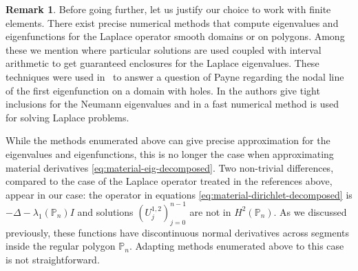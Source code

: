 \documentclass[11pt]{article}
\numberwithin{equation}{section}\newtheorem*{jepEnonce}{\jepEnonceTitle}\newenvironment{enonce*}[1]{\def\jepEnonceTitle{#1}\jepEnonce}{\endjepEnonce}\newtheorem*{conj*}{Conjecture}
\theoremstyle{plain}
\theoremstyle{definition}
\newtheorem{rem}[thm]{Remark}
\def\Pp{{\mathbb{P}_n}}
\begin{document}
\begin{rem}
Before going further, let us justify our choice to work with finite elements. There exist precise numerical methods that compute eigenvalues and eigenfunctions for the Laplace operator smooth domains or on polygons. Among these we mention \cite{dahne-salvy} where particular solutions are used coupled with interval arithmetic to get guaranteed enclosures for the Laplace eigenvalues. These techniques were used in~\cite{dahne-payne} to answer a question of Payne regarding the nodal line of the first eigenfunction on a domain with holes. In \cite{barnett-hassell} the authors give tight inclusions for the Neumann eigenvalues and in \cite{trefethen} a fast numerical method is used for solving Laplace problems.

While the methods enumerated above can give precise approximation for the eigenvalues and eigenfunctions, this is no longer the case when approximating material derivatives \eqref{eq:material-eig-decomposed}. Two non-trivial differences, compared to the case of the Laplace operator treated in the references above, appear in our case: the operator in equations \eqref{eq:material-dirichlet-decomposed} is $-\Delta -\lambda_1(\Pp)I$ and solutions $(U_j^{1,2})_{j=0}^{n-1}$ are not in $H^2(\Pp)$. As we discussed previously, these functions have discontinuous normal derivatives across segments inside the regular polygon $\Pp$. Adapting methods enumerated above to this case is not straightforward.
\end{rem}
\end{document}
